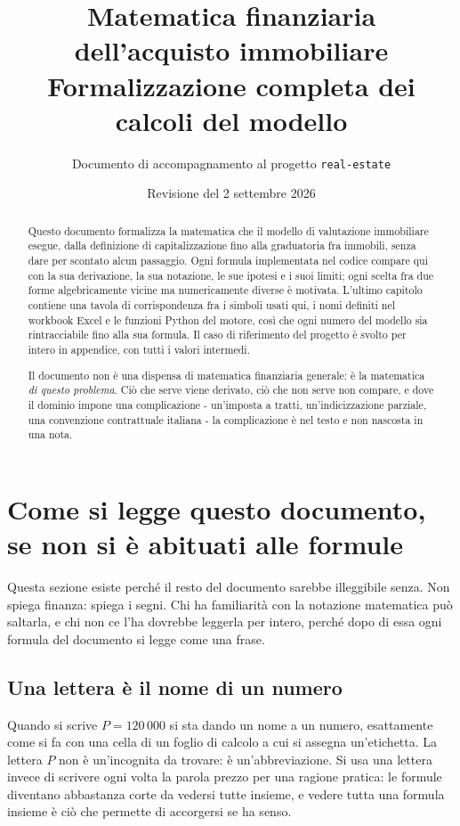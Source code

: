 \documentclass[11pt,a4paper]{article}
\title{Matematica finanziaria dell'acquisto immobiliare\\[0.3em]
\large Formalizzazione completa dei calcoli del modello}
\author{Documento di accompagnamento al progetto \texttt{real-estate}}
\date{Revisione del 2 settembre 2026}
\theoremstyle{definition}
\theoremstyle{plain}
\begin{document}
\maketitle

\begin{abstract}
\noindent Questo documento formalizza la matematica che il modello di valutazione immobiliare esegue, dalla definizione di capitalizzazione fino alla graduatoria fra immobili, senza dare per scontato alcun passaggio. Ogni formula implementata nel codice compare qui con la sua derivazione, la sua notazione, le sue ipotesi e i suoi limiti; ogni scelta fra due forme algebricamente vicine ma numericamente diverse è motivata. L'ultimo capitolo contiene una tavola di corrispondenza fra i simboli usati qui, i nomi definiti nel workbook Excel e le funzioni Python del motore, così che ogni numero del modello sia rintracciabile fino alla sua formula. Il caso di riferimento del progetto è svolto per intero in appendice, con tutti i valori intermedi.

Il documento non è una dispensa di matematica finanziaria generale: è la matematica \emph{di questo problema}. Ciò che serve viene derivato, ciò che non serve non compare, e dove il dominio impone una complicazione - un'imposta a tratti, un'indicizzazione parziale, una convenzione contrattuale italiana - la complicazione è nel testo e non nascosta in una nota.
\end{abstract}

\tableofcontents
\newpage

\section{Come si legge questo documento, se non si è abituati alle formule}

Questa sezione esiste perché il resto del documento sarebbe illeggibile senza. Non spiega finanza: spiega i segni. Chi ha familiarità con la notazione matematica può saltarla, e chi non ce l'ha dovrebbe leggerla per intero, perché dopo di essa ogni formula del documento si legge come una frase.

\subsection{Una lettera è il nome di un numero}

Quando si scrive $P = 120\,000$ si sta dando un nome a un numero, esattamente come si fa con una cella di un foglio di calcolo a cui si assegna un'etichetta. La lettera $P$ non è un'incognita da trovare: è un'abbreviazione. Si usa una lettera invece di scrivere ogni volta la parola prezzo per una ragione pratica: le formule diventano abbastanza corte da vedersi tutte insieme, e vedere tutta una formula insieme è ciò che permette di accorgersi se ha senso.
\end{document}

